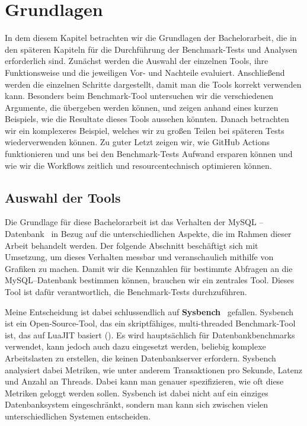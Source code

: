 \chapter{Grundlagen}\label{ch:grundlagen}

In dem diesem Kapitel betrachten wir die Grundlagen der Bachelorarbeit, die in den späteren Kapiteln für die Durchführung der Benchmark-Tests und Analysen erforderlich sind.
Zunächst werden die Auswahl der einzelnen Tools, ihre Funktionsweise und die jeweiligen Vor- und Nachteile evaluiert.
Anschließend werden die einzelnen Schritte dargestellt, damit man die Tools korrekt verwenden kann.
Besonders beim Benchmark-Tool untersuchen wir die verschiedenen Argumente, die übergeben werden können, und zeigen anhand eines kurzen Beispiels, wie die Resultate dieses Tools aussehen könnten.
Danach betrachten wir ein komplexeres Beispiel, welches wir zu großen Teilen bei späteren Tests wiederverwenden können.
Zu guter Letzt zeigen wir, wie GitHub Actions funktionieren und uns bei den Benchmark-Tests Aufwand ersparen können und wie wir die Workflows zeitlich und resourcentechnisch optimieren können.

\section{Auswahl der Tools}\label{sec:auswahl-der-tools}

Die Grundlage für diese Bachelorarbeit ist das Verhalten der MySQL – Datenbank~\cite{sysbench_mysql} in Bezug auf die unterschiedlichen Aspekte, die im Rahmen dieser Arbeit behandelt werden.
Der folgende Abschnitt beschäftigt sich mit Umsetzung, um dieses Verhalten messbar und veranschaulich mithilfe von Grafiken zu machen.
Damit wir die Kennzahlen für bestimmte Abfragen an die MySQL–Datenbank bestimmen können, brauchen wir ein zentrales Tool.
Dieses Tool ist dafür verantwortlich, die Benchmark-Tests durchzuführen.

Meine Entscheidung ist dabei schlussendlich auf \textbf{Sysbench}~\cite{sysbench_repo} gefallen.
Sysbench ist ein Open-Source-Tool, das ein skriptfähiges, multi-threaded Benchmark-Tool ist, das auf LuaJIT basiert (\cite[pp. 50--66]{schwartz2012high}).
Es wird hauptsächlich für Datenbankbenchmarks verwendet, kann jedoch auch dazu eingesetzt werden, beliebig komplexe Arbeitslasten zu erstellen, die keinen Datenbankserver erfordern.
Sysbench analysiert dabei Metriken, wie unter anderem Transaktionen pro Sekunde, Latenz und Anzahl an Threads.
Dabei kann man genauer spezifizieren, wie oft diese Metriken geloggt werden sollen.
Sysbench ist dabei nicht auf ein einziges Datenbanksystem eingeschränkt, sondern man kann sich zwischen vielen unterschiedlichen Systemen entscheiden.

